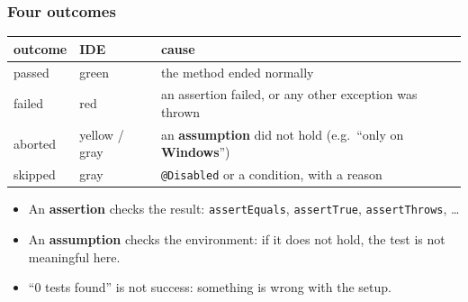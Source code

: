 \documentclass[aspectratio=169,10pt,compress]{beamer}
\newcommand{\win}{\textbf{Windows}}
\begin{document}
\begin{frame}[t,fragile] \frametitle{Four outcomes}
  \begin{center}\small
  \begin{tabular}{llL{0.5\textwidth}}
    \toprule
    \textbf{outcome} & \textbf{IDE}          & \textbf{cause} \\
    \midrule
    passed           & green                 & the method ended normally \\
    failed           & red                   & an assertion failed, or any other exception was thrown \\
    aborted          & yellow / gray         & an \textbf{assumption} did not hold (e.g.\ ``only on \win'') \\
    skipped          & gray                  & \texttt{@Disabled} or a condition, with a reason \\
    \bottomrule
  \end{tabular}
  \end{center}
  \begin{itemize}\small
    \item An \textbf{assertion} checks the result: \texttt{assertEquals}, \texttt{assertTrue}, \texttt{assertThrows}, \dots
    \item An \textbf{assumption} checks the environment: if it does not hold, the test is not meaningful here.
    \item ``0 tests found'' is not success: something is wrong with the setup.
  \end{itemize}
\end{frame}

\end{document}
